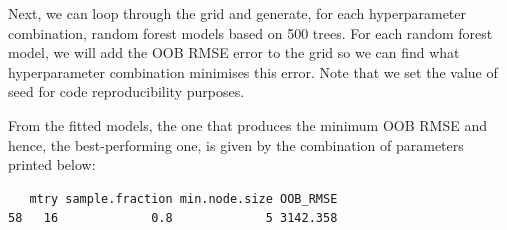\documentclass[
  letterpaper,
  DIV=11,
  numbers=noendperiod]{scrreprt}
\newenvironment{Shaded}{\begin{snugshade}}{\end{snugshade}}
\newcommand{\AttributeTok}[1]{\textcolor[rgb]{0.40,0.45,0.13}{#1}}
\newcommand{\CommentTok}[1]{\textcolor[rgb]{0.37,0.37,0.37}{#1}}
\newcommand{\ControlFlowTok}[1]{\textcolor[rgb]{0.00,0.23,0.31}{#1}}
\newcommand{\DecValTok}[1]{\textcolor[rgb]{0.68,0.00,0.00}{#1}}
\newcommand{\FunctionTok}[1]{\textcolor[rgb]{0.28,0.35,0.67}{#1}}
\newcommand{\NormalTok}[1]{\textcolor[rgb]{0.00,0.23,0.31}{#1}}
\newcommand{\OtherTok}[1]{\textcolor[rgb]{0.00,0.23,0.31}{#1}}
\newcommand{\SpecialCharTok}[1]{\textcolor[rgb]{0.37,0.37,0.37}{#1}}
\begin{document}
Next, we can loop through the grid and generate, for each hyperparameter
combination, random forest models based on 500 trees. For each random
forest model, we will add the OOB RMSE error to the grid so we can find
what hyperparameter combination minimises this error. Note that we set
the value of seed for code reproducibility purposes.

\begin{Shaded}
\end{Shaded}

From the fitted models, the one that produces the minimum OOB RMSE and
hence, the best-performing one, is given by the combination of
parameters printed below:

\begin{Shaded}
\end{Shaded}

\begin{verbatim}
   mtry sample.fraction min.node.size OOB_RMSE
58   16             0.8             5 3142.358
\end{verbatim}
\end{document}
